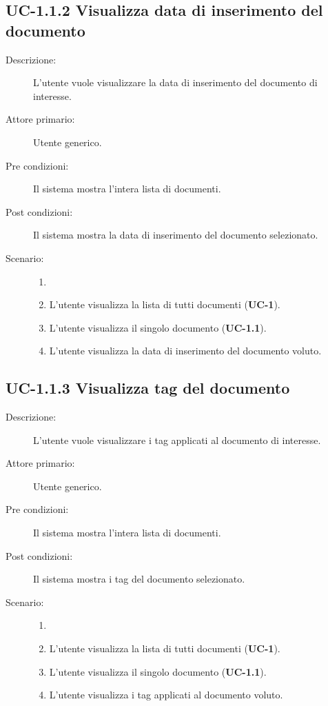 \subsection{UC-1.1.2 Visualizza data di inserimento del documento}
\begin{description}
    \item[Descrizione:] L'utente vuole visualizzare la data di inserimento del documento di interesse.
    \item[Attore primario:] Utente generico.
    \item[Pre condizioni:] Il sistema mostra l’intera lista di documenti.
    \item[Post condizioni:] Il sistema mostra la data di inserimento del documento selezionato.
    \item[Scenario:] 
    \begin{enumerate}
        \item[]
        \item L’utente visualizza la lista di tutti documenti (\textbf{UC-1}).
        \item L'utente visualizza il singolo documento (\textbf{UC-1.1}).
        \item L'utente visualizza la data di inserimento del documento voluto.
    \end{enumerate}
\end{description}

\subsection{UC-1.1.3 Visualizza tag del documento}
\begin{description}
    \item[Descrizione:] L'utente vuole visualizzare i tag applicati al documento di interesse.
    \item[Attore primario:] Utente generico.
    \item[Pre condizioni:] Il sistema mostra l’intera lista di documenti.
    \item[Post condizioni:] Il sistema mostra i tag del documento selezionato.
    \item[Scenario:]
    \begin{enumerate}
        \item[]
        \item L’utente visualizza la lista di tutti documenti (\textbf{UC-1}).
        \item L'utente visualizza il singolo documento (\textbf{UC-1.1}).
        \item L'utente visualizza i tag applicati al documento voluto.
    \end{enumerate}
\end{description}

